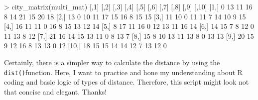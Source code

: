 \documentclass[
]{article}
\newenvironment{Shaded}{\begin{snugshade}}{\end{snugshade}}
\newcommand{\DecValTok}[1]{\textcolor[rgb]{0.00,0.00,0.81}{#1}}
\newcommand{\FunctionTok}[1]{\textcolor[rgb]{0.00,0.00,0.00}{#1}}
\newcommand{\NormalTok}[1]{#1}
\newcommand{\SpecialCharTok}[1]{\textcolor[rgb]{0.00,0.00,0.00}{#1}}
\begin{document}
\begin{Shaded}
\begin{Highlighting}[]
\SpecialCharTok{\textgreater{}} \FunctionTok{city\_matrix}\NormalTok{(multi\_mat)}
\NormalTok{      [,}\DecValTok{1}\NormalTok{] [,}\DecValTok{2}\NormalTok{] [,}\DecValTok{3}\NormalTok{] [,}\DecValTok{4}\NormalTok{] [,}\DecValTok{5}\NormalTok{] [,}\DecValTok{6}\NormalTok{] [,}\DecValTok{7}\NormalTok{] [,}\DecValTok{8}\NormalTok{] [,}\DecValTok{9}\NormalTok{] [,}\DecValTok{10}\NormalTok{]}
\NormalTok{ [}\DecValTok{1}\NormalTok{,]    }\DecValTok{0}   \DecValTok{13}   \DecValTok{11}   \DecValTok{16}    \DecValTok{8}   \DecValTok{14}   \DecValTok{21}   \DecValTok{15}   \DecValTok{20}    \DecValTok{18}
\NormalTok{ [}\DecValTok{2}\NormalTok{,]   }\DecValTok{13}    \DecValTok{0}   \DecValTok{10}   \DecValTok{11}   \DecValTok{17}   \DecValTok{15}   \DecValTok{16}    \DecValTok{8}   \DecValTok{15}    \DecValTok{15}
\NormalTok{ [}\DecValTok{3}\NormalTok{,]   }\DecValTok{11}   \DecValTok{10}    \DecValTok{0}   \DecValTok{11}   \DecValTok{11}    \DecValTok{7}   \DecValTok{14}   \DecValTok{10}    \DecValTok{9}    \DecValTok{15}
\NormalTok{ [}\DecValTok{4}\NormalTok{,]   }\DecValTok{16}   \DecValTok{11}   \DecValTok{11}    \DecValTok{0}   \DecValTok{16}    \DecValTok{8}   \DecValTok{15}   \DecValTok{13}   \DecValTok{12}    \DecValTok{14}
\NormalTok{ [}\DecValTok{5}\NormalTok{,]    }\DecValTok{8}   \DecValTok{17}   \DecValTok{11}   \DecValTok{16}    \DecValTok{0}   \DecValTok{12}   \DecValTok{13}   \DecValTok{11}   \DecValTok{16}    \DecValTok{14}
\NormalTok{ [}\DecValTok{6}\NormalTok{,]   }\DecValTok{14}   \DecValTok{15}    \DecValTok{7}    \DecValTok{8}   \DecValTok{12}    \DecValTok{0}   \DecValTok{11}   \DecValTok{13}    \DecValTok{8}    \DecValTok{12}
\NormalTok{ [}\DecValTok{7}\NormalTok{,]   }\DecValTok{21}   \DecValTok{16}   \DecValTok{14}   \DecValTok{15}   \DecValTok{13}   \DecValTok{11}    \DecValTok{0}    \DecValTok{8}   \DecValTok{13}     \DecValTok{7}
\NormalTok{ [}\DecValTok{8}\NormalTok{,]   }\DecValTok{15}    \DecValTok{8}   \DecValTok{10}   \DecValTok{13}   \DecValTok{11}   \DecValTok{13}    \DecValTok{8}    \DecValTok{0}   \DecValTok{13}    \DecValTok{13}
\NormalTok{ [}\DecValTok{9}\NormalTok{,]   }\DecValTok{20}   \DecValTok{15}    \DecValTok{9}   \DecValTok{12}   \DecValTok{16}    \DecValTok{8}   \DecValTok{13}   \DecValTok{13}    \DecValTok{0}    \DecValTok{12}
\NormalTok{[}\DecValTok{10}\NormalTok{,]   }\DecValTok{18}   \DecValTok{15}   \DecValTok{15}   \DecValTok{14}   \DecValTok{14}   \DecValTok{12}    \DecValTok{7}   \DecValTok{13}   \DecValTok{12}     \DecValTok{0}
\end{Highlighting}
\end{Shaded}

Certainly, there is a simpler way to calculate the distance by using the
\texttt{dist()}function. Here, I want to practice and hone my
understanding about R coding and basic logic of types of distance.
Therefore, this script might look not that concise and elegant. Thanks!
\end{document}
